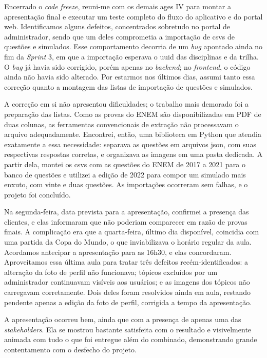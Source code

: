 Encerrado o \textit{code freeze}, reuni-me com os demais \ac{ages} IV para montar a apresentação final e executar um teste completo do fluxo do aplicativo e do portal web. Identificamos alguns defeitos, concentrados sobretudo no portal de administrador, sendo que um deles comprometia a importação de \acp{csv} de questões e simulados. Esse comportamento decorria de um \textit{bug} apontado ainda no fim da \textit{Sprint} 3, em que a importação esperava o \ac{uuid} das disciplinas e da trilha. O \textit{bug} já havia sido corrigido, porém apenas no \textit{backend}; no \textit{frontend}, o código ainda não havia sido alterado. Por estarmos nos últimos dias, assumi tanto essa correção quanto a montagem das listas de importação de questões e simulados.

A correção em si não apresentou dificuldades; o trabalho mais demorado foi a preparação das listas. Como as provas do ENEM são disponibilizadas em PDF de duas colunas, as ferramentas convencionais de extração não processavam o arquivo adequadamente. Encontrei, então, uma biblioteca em Python que atendia exatamente a essa necessidade: separava as questões em arquivos \ac{json}, com suas respectivas respostas corretas, e organizava as imagens em uma pasta dedicada. A partir dela, montei os \acp{csv} com as questões do ENEM de 2017 a 2021 para o banco de questões e utilizei a edição de 2022 para compor um simulado mais enxuto, com vinte e duas questões. As importações ocorreram sem falhas, e o projeto foi concluído.

Na segunda-feira, data prevista para a apresentação, confirmei a presença das clientes, e elas informaram que não poderiam comparecer em razão de provas finais. A complicação era que a quarta-feira, último dia disponível, coincidia com uma partida da Copa do Mundo, o que inviabilizava o horário regular da aula. Acordamos antecipar a apresentação para as 16h30, e elas concordaram. Aproveitamos essa última aula para tratar três defeitos recém-identificados: a alteração da foto de perfil não funcionava; tópicos excluídos por um administrador continuavam visíveis aos usuários; e as imagens dos tópicos não carregavam corretamente. Dois deles foram resolvidos ainda em aula, restando pendente apenas a edição da foto de perfil, corrigida a tempo da apresentação.

A apresentação ocorreu bem, ainda que com a presença de apenas uma das \textit{stakeholders}. Ela se mostrou bastante satisfeita com o resultado e visivelmente animada com tudo o que foi entregue além do combinado, demonstrando grande contentamento com o desfecho do projeto.
